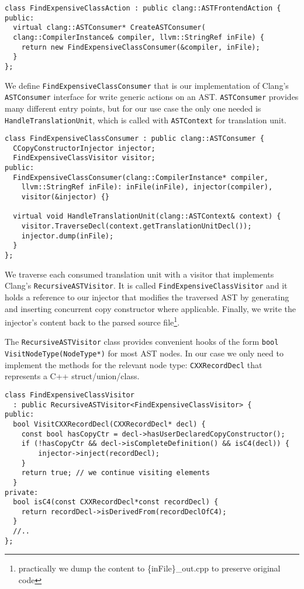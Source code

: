 \documentclass{article}
\begin{document}
\begin{verbatim}
class FindExpensiveClassAction : public clang::ASTFrontendAction {
public:
  virtual clang::ASTConsumer* CreateASTConsumer(
  clang::CompilerInstance& compiler, llvm::StringRef inFile) {
    return new FindExpensiveClassConsumer(&compiler, inFile);
  }
};
\end{verbatim}

We define \texttt{FindExpensiveClassConsumer} that is our implementation of Clang's \texttt{ASTConsumer} interface for write generic actions on an AST. \texttt{ASTConsumer} provides many different entry points, but for our use case the only one needed is \texttt{HandleTranslationUnit}, which is called with \texttt{ASTContext} for translation unit.

\begin{verbatim}
class FindExpensiveClassConsumer : public clang::ASTConsumer {
  CCopyConstructorInjector injector;
  FindExpensiveClassVisitor visitor;
public:
  FindExpensiveClassConsumer(clang::CompilerInstance* compiler,
  	llvm::StringRef inFile): inFile(inFile), injector(compiler),
  	visitor(&injector) {}
  
  virtual void HandleTranslationUnit(clang::ASTContext& context) {
    visitor.TraverseDecl(context.getTranslationUnitDecl());
    injector.dump(inFile);
  }
};
\end{verbatim}

We traverse each consumed translation unit with a visitor that implements Clang's \texttt{RecursiveASTVisitor}. It is called \texttt{FindExpensiveClassVisitor} and it holds a reference to our injector that modifies the traversed AST by generating and inserting concurrent copy constructor where applicable. Finally, we write the injector's content back to the parsed source file\footnote{practically we dump the content to \{inFile\}\_out.cpp to preserve original code}.

The \texttt{RecursiveASTVisitor} class provides convenient hooks of the form \texttt{bool VisitNodeType(NodeType*)} for most AST nodes. In our case we only need to implement the methods for the relevant node type: \texttt{CXXRecordDecl} that represents a C++ struct/union/class.

\begin{verbatim}
class FindExpensiveClassVisitor
  : public RecursiveASTVisitor<FindExpensiveClassVisitor> {
public:
  bool VisitCXXRecordDecl(CXXRecordDecl* decl) {
    const bool hasCopyCtr = decl->hasUserDeclaredCopyConstructor();
    if (!hasCopyCtr && decl->isCompleteDefinition() && isC4(decl)) {
   	    injector->inject(recordDecl);
    }
    return true; // we continue visiting elements
  }
private:
  bool isC4(const CXXRecordDecl*const recordDecl) {
    return recordDecl->isDerivedFrom(recordDeclOfC4);
  }
  //..
};
\end{verbatim}
\end{document}
